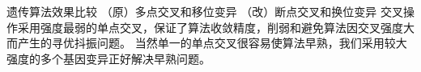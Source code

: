 \documentclass[xcolor=table,dvipsnames,svgnames,aspectratio=169,fontset=ubuntu]{ctexbeamer}
\begin{document}
\begin{frame}{遗传算法效果比较}
  （原）多点交叉和移位变异
  \vskip 5pt
  （改）断点交叉和换位变异
  \vskip 10pt
  交叉操作采用强度最弱的单点交叉，保证了算法收敛精度，削弱和避免算法因交叉强度大而产生的寻优抖振问题。
当然单一的单点交叉很容易使算法早熟，我们采用较大强度的多个基因变异正好解决早熟问题。

\end{frame}










































\makebottom
\end{document}
